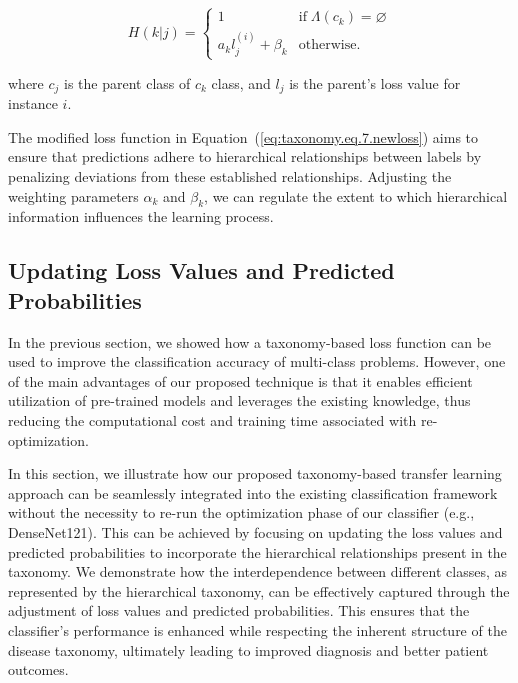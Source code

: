 \begin{equation}
    \label{eq:taxonomy.eq.8.hierarchical_penalty.loss}
    H(k \vert j) = \left\{ \begin{array}{lc}1 & \text{if} \; \Lambda(c_k) = \varnothing \\ a_k l_j^{(i)} + \beta_k & \text{otherwise.} \end{array} \right.
\end{equation}

where $c_j $ is the parent class of $c_k $ class, and $l_j $ is the parent's loss value for instance $i $.

The modified loss function in Equation~(\ref{eq:taxonomy.eq.7.newloss})  aims to ensure that predictions adhere to hierarchical relationships between labels by penalizing deviations from these established relationships. Adjusting the weighting parameters $\alpha_k $ and $\beta_k $, we can regulate the extent to which hierarchical information influences the learning process.

\subsection{Updating Loss Values and Predicted Probabilities}\label{subsec:updating-loss-values-and-predicted-probabilities}

In the previous section, we showed how a taxonomy-based loss function can be used to improve the classification accuracy of multi-class problems. However, one of the main advantages of our proposed technique is that it enables efficient utilization of pre-trained models and leverages the existing knowledge, thus reducing the computational cost and training time associated with re-optimization.

In this section, we illustrate how our proposed taxonomy-based transfer learning approach can be seamlessly integrated into the existing classification framework without the necessity to re-run the optimization phase of our classifier (e.g., DenseNet121). This can be achieved by focusing on updating the loss values and predicted probabilities to incorporate the hierarchical relationships present in the taxonomy. We demonstrate how the interdependence between different classes, as represented by the hierarchical taxonomy, can be effectively captured through the adjustment of loss values and predicted probabilities. This ensures that the classifier's performance is enhanced while respecting the inherent structure of the disease taxonomy, ultimately leading to improved diagnosis and better patient outcomes.

